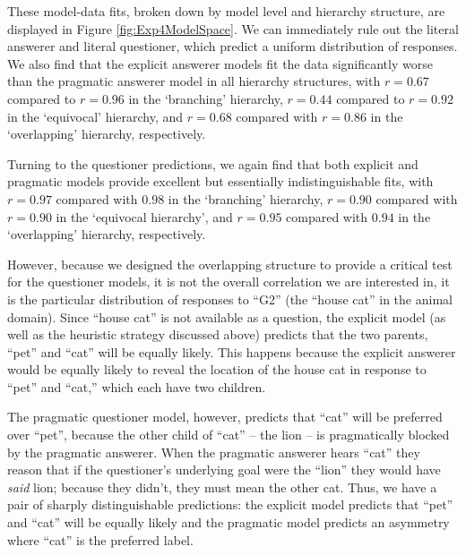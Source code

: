 \documentclass[12pt, floatsintext, jou]{apa6}
\begin{document}
These model-data fits, broken down by model level and hierarchy structure, are displayed in Figure \ref{fig:Exp4ModelSpace}. We can immediately rule out the literal answerer and literal questioner, which predict a uniform distribution of responses. We also find that the explicit answerer models fit the data significantly worse than the pragmatic answerer model in all hierarchy structures, with $r = 0.67$ compared to $r = 0.96$ in the `branching' hierarchy, $r = 0.44$ compared to $r = 0.92$ in the `equivocal' hierarchy, and $r = 0.68$ compared with $r = 0.86$ in the `overlapping' hierarchy, respectively. 

Turning to the questioner predictions, we again find that both explicit and pragmatic models provide excellent but essentially indistinguishable fits, with $r = 0.97$ compared with $0.98$ in the `branching' hierarchy, $r = 0.90$ compared with $r = 0.90$ in the `equivocal hierarchy', and $r = 0.95$ compared with $0.94$ in the `overlapping' hierarchy, respectively. 

However, because we designed the overlapping structure to provide a critical test for the questioner models, it is not the overall correlation we are interested in, it is the particular distribution of responses to ``G2'' (the ``house cat'' in the animal domain). Since ``house cat'' is not available as a question, the explicit model (as well as the heuristic strategy discussed above) predicts that the two parents, ``pet'' and ``cat'' will be equally likely. This happens because the explicit answerer would be equally likely to reveal the location of the house cat in response to ``pet'' and ``cat,'' which each have two children. 

The pragmatic questioner model, however, predicts that ``cat'' will be preferred over ``pet'', because the other child of ``cat'' -- the lion -- is pragmatically blocked by the pragmatic answerer. When the pragmatic answerer hears ``cat'' they reason that if the questioner's underlying goal were the ``lion'' they would have \emph{said} lion; because they didn't, they must mean the other cat. Thus, we have a pair of sharply distinguishable predictions: the explicit model predicts that ``pet'' and ``cat'' will be equally likely and the pragmatic model predicts an asymmetry where ``cat'' is the preferred label. 
\end{document}
